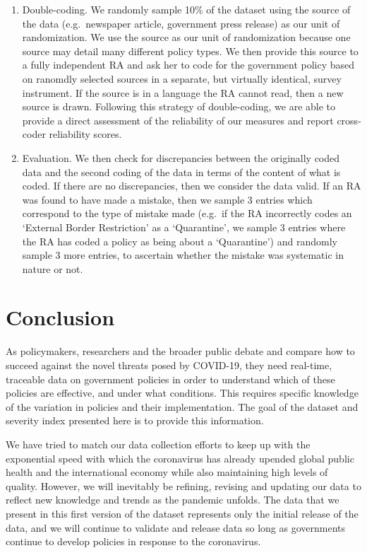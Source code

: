 \documentclass[]{article}
\begin{document}
\begin{enumerate}
\def\labelenumi{\arabic{enumi}.}
\item
  Double-coding. We randomly sample 10\% of the dataset using the source of the data (e.g.~newspaper article, government press release) as our unit of randomization. We use the source as our unit of randomization because one source may detail many different policy types. We then provide this source to a fully independent RA and ask her to code for the government policy based on ranomdly selected sources in a separate, but virtually identical, survey instrument. If the source is in a language the RA cannot read, then a new source is drawn. Following this strategy of double-coding, we are able to provide a direct assessment of the reliability of our measures and report cross-coder reliability scores.
\item
  Evaluation. We then check for discrepancies between the originally coded data and the second coding of the data in terms of the content of what is coded. If there are no discrepancies, then we consider the data valid. If an RA was found to have made a mistake, then we sample 3 entries which correspond to the type of mistake made (e.g.~if the RA incorrectly codes an `External Border Restriction' as a `Quarantine', we sample 3 entries where the RA has coded a policy as being about a `Quarantine') and randomly sample 3 more entries, to ascertain whether the mistake was systematic in nature or not.
\end{enumerate}

\hypertarget{conclusion}{%
\section{Conclusion}\label{conclusion}}

As policymakers, researchers and the broader public debate and compare how to succeed against the novel threats posed by COVID-19, they need real-time, traceable data on government policies in order to understand which of these policies are effective, and under what conditions. This requires specific knowledge of the variation in policies and their implementation. The goal of the dataset and severity index presented here is to provide this information.

We have tried to match our data collection efforts to keep up with the exponential speed with which the coronavirus has already upended global public health and the international economy while also maintaining high levels of quality. However, we will inevitably be refining, revising and updating our data to reflect new knowledge and trends as the pandemic unfolds. The data that we present in this first version of the dataset represents only the initial release of the data, and we will continue to validate and release data so long as governments continue to develop policies in response to the coronavirus.
\end{document}
